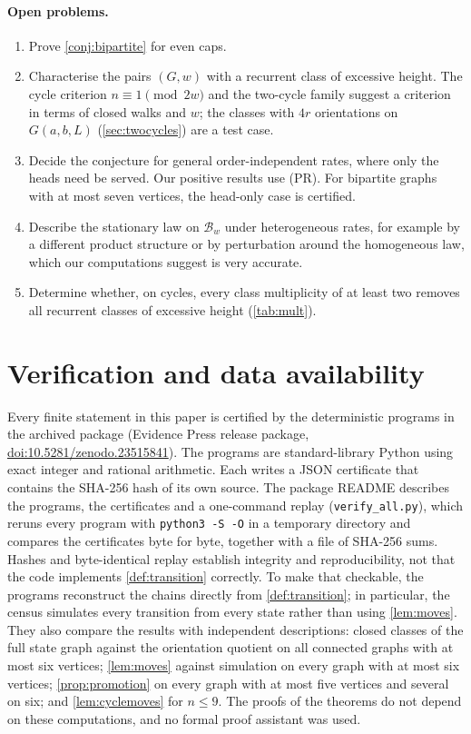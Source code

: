 \documentclass[11pt,a4paper]{article}
\theoremstyle{plain}
\theoremstyle{plain}
\newcommand{\Bal}{\mathcal{B}}
\begin{document}
\paragraph{Open problems.}
\begin{enumerate}[label=(\arabic*),leftmargin=*]
\item Prove \cref{conj:bipartite} for even caps.
\item Characterise the pairs $(G,w)$ with a recurrent class of excessive height. The cycle criterion $n\equiv1\pmod{2w}$ and the two-cycle family suggest a criterion in terms of closed walks and $w$; the classes with $4r$ orientations on $G(a,b,L)$ (\cref{sec:twocycles}) are a test case.
\item Decide the conjecture for general order-independent rates, where only the heads need be served. Our positive results use (PR). For bipartite graphs with at most seven vertices, the head-only case is certified.
\item Describe the stationary law on $\Bal_w$ under heterogeneous rates, for example by a different product structure or by perturbation around the homogeneous law, which our computations suggest is very accurate.
\item Determine whether, on cycles, every class multiplicity of at least two removes all recurrent classes of excessive height (\cref{tab:mult}).
\end{enumerate}

\section{Verification and data availability}\label{sec:data}

Every finite statement in this paper is certified by the deterministic programs in the archived package (Evidence Press release package, \href{https://doi.org/10.5281/zenodo.23515841}{doi:10.5281/zenodo.23515841}). The programs are standard-library Python using exact integer and rational arithmetic. Each writes a JSON certificate that contains the SHA-256 hash of its own source. The package README describes the programs, the certificates and a one-command replay (\texttt{verify\_all.py}), which reruns every program with \texttt{python3 -S -O} in a temporary directory and compares the certificates byte for byte, together with a file of SHA-256 sums. Hashes and byte-identical replay establish integrity and reproducibility, not that the code implements \cref{def:transition} correctly. To make that checkable, the programs reconstruct the chains directly from \cref{def:transition}; in particular, the census simulates every transition from every state rather than using \cref{lem:moves}. They also compare the results with independent descriptions: closed classes of the full state graph against the orientation quotient on all connected graphs with at most six vertices; \cref{lem:moves} against simulation on every graph with at most six vertices; \cref{prop:promotion} on every graph with at most five vertices and several on six; and \cref{lem:cyclemoves} for $n\le9$. The proofs of the theorems do not depend on these computations, and no formal proof assistant was used.
\end{document}
